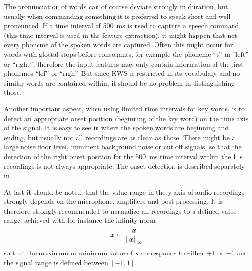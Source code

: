 The pronunciation of words can of course deviate strongly in duration, but usually when commanding something it is preferred to speak short and well pronounced.
If a time interval of \SI{500}{\milli\second} is used to capture a speech command (this time interval is used in the feature extraction), it might happen that not every phoneme of the spoken words are captured. 
Often this might occur for words with glottal stops before consonants, for example the phoneme \enquote{t} in \enquote{left} or \enquote{right}, therefore the input features may only contain information of the first phonemes \enquote{lef} or \enquote{righ}.
But since KWS is restricted in its vocabulary and no similar words are contained within, it should be no problem in distinguishing those.

Another important aspect, when using limited time intervals for key words, is to detect an appropriate onset position (beginning of the key word) on the time axis of the signal.
It is easy to see in  where the spoken words are beginning and ending, but usually not all recordings are as clean as those.
There might be a large noise floor level, imminent background noise or cut off signals, so that the detection of the right onset position for the \SI{500}{\milli\second} time interval within the \SI{1}{\second} recordings is not always appropriate.
The onset detection is described separately in .

At last it should be noted, that the value range in the y-axis of audio recordings strongly depends on the microphone, amplifiers and post processing.
It is therefore strongly recommended to normalize all recordings to a defined value range, achieved with for instance the infinity norm:
\begin{equation}
  \bm{x} \gets \frac{\bm{x}}{\norm{\bm{x}}_\infty}
\end{equation}
so that the maximum or minimum value of $\bm{x}$ corresponds to either $+1$ or $-1$ and the signal range is defined between $[-1, 1]$.